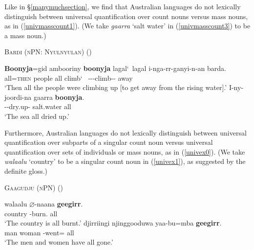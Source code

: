 \documentclass[12pt,egregdoesnotlikesansseriftitles]{scrartcl}
\begin{document}
Like in \S\ref{manymuchsection}, we find that Australian languages do not lexically distinguish between universal quantification over count nouns versus mass nouns, as in (\ref{univmasscount1}). (We take \textit{gaarra} `salt water' in (\ref{univmasscount3}) to be a mass noun.)
\begin{exe}
  \ex \textsc{Bardi (nPN: Nyulnyulan)} \hfill(\citealt{bowern12}) \label{univmasscount1}
  \begin{xlist}
    \ex %
    \gll \textbf{Boonyja}=gid ambooriny \textbf{boonyja} lagal\char`~lagal i-nga-rr-ganyi-n-an barda.\\
    all=\textsc{then} people all climb\char`~\Rdp{}  \Third-\Pst-\Aug-climb-\Cont-\Rempst{} away\\
    `Then all the people were climbing up [to get away from the rising water].'\label{univmasscount2}
    \ex \gll I-ny-joordi-na gaarra \textbf{boonyja}.\\
    \Third\M-\Pst-dry.up-\Rempst{} salt.water all\\
    `The sea all dried up.'\label{univmasscount3} %
  \end{xlist}
\end{exe}

Furthermore,  Australian languages  do not lexically distinguish between universal quantification  over subparts of a singular count noun versus universal quantification over sets of individuals or mass nouns, as in (\ref{univex0}). (We take \textit{walaalu} `country' to be a singular count noun in (\ref{univex1}), as suggested by the definite gloss.)
\begin{exe}
 \ex \textsc{Gaagudju (nPN)} \hfill (\citealt[307]{harvey92}) \label{univex0}
  \begin{xlist}
      \ex \gll walaalu $\varnothing$-naana \textbf{geegirr}.\\
    country \Cliv-burn.\Pp{} all\\
    \glt `The country is all burnt.' \label{univex1}
    \ex \gll djirriingi njinggooduwa yaa-bu=mba \textbf{geegirr}.\\
    man woman \Third\Cli-went=\Aug{} all\\
    \glt `The men and women have all gone.' \label{univex2}
  \end{xlist}
\end{exe}
\end{document}

